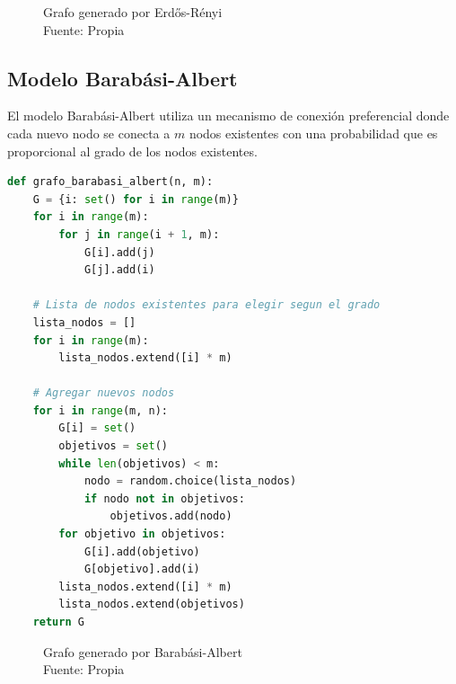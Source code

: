\documentclass[12pt]{book}
\begin{document}
\begin{figure}
\caption{Grafo generado por Erdős-Rényi\\Fuente: Propia}
\end{figure}

\subsection{Modelo Barabási-Albert}

El modelo Barabási-Albert utiliza un mecanismo de conexión preferencial donde cada nuevo nodo se conecta a \( m \) nodos existentes con una probabilidad que es proporcional al grado de los nodos existentes.

\begin{lstlisting}[language=Python]
def grafo_barabasi_albert(n, m):
    G = {i: set() for i in range(m)}
    for i in range(m):
        for j in range(i + 1, m):
            G[i].add(j)
            G[j].add(i)

    # Lista de nodos existentes para elegir segun el grado
    lista_nodos = []
    for i in range(m):
        lista_nodos.extend([i] * m)

    # Agregar nuevos nodos
    for i in range(m, n):
        G[i] = set()
        objetivos = set()
        while len(objetivos) < m:
            nodo = random.choice(lista_nodos)
            if nodo not in objetivos:
                objetivos.add(nodo)
        for objetivo in objetivos:
            G[i].add(objetivo)
            G[objetivo].add(i)
        lista_nodos.extend([i] * m)
        lista_nodos.extend(objetivos)
    return G
\end{lstlisting}

\begin{figure}[h]
\caption{Grafo generado por Barabási-Albert\\Fuente: Propia}
\end{figure}
\newpage
\end{document}
